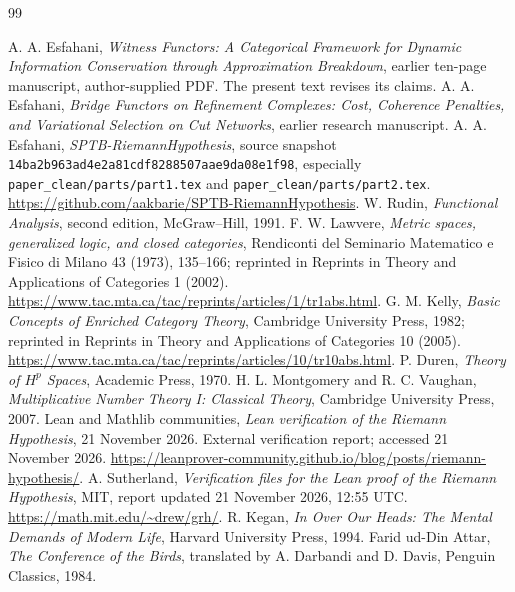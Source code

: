\documentclass[11pt,letterpaper]{article}
\begin{document}
\begin{thebibliography}{99}
\raggedright
{} A. A. Esfahani,
\emph{Witness Functors: A Categorical Framework for Dynamic Information
Conservation through Approximation Breakdown}, earlier ten-page manuscript,
author-supplied PDF. The present text revises its claims.
 A. A. Esfahani,
\emph{Bridge Functors on Refinement Complexes: Cost, Coherence Penalties,
and Variational Selection on Cut Networks}, earlier research manuscript.
 A. A. Esfahani,
\emph{SPTB-RiemannHypothesis}, source snapshot
\texttt{14ba2b963ad4e2a81cdf8288507aae9da08e1f98},
especially \texttt{paper\_clean/parts/part1.tex} and
\texttt{paper\_clean/parts/part2.tex}.
\url{https://github.com/aakbarie/SPTB-RiemannHypothesis}.
 W. Rudin, \emph{Functional Analysis}, second edition,
McGraw--Hill, 1991.
 F. W. Lawvere,
\emph{Metric spaces, generalized logic, and closed categories},
Rendiconti del Seminario Matematico e Fisico di Milano 43 (1973), 135--166;
reprinted in Reprints in Theory and Applications of Categories 1 (2002).
\url{https://www.tac.mta.ca/tac/reprints/articles/1/tr1abs.html}.
 G. M. Kelly, \emph{Basic Concepts of Enriched Category Theory},
Cambridge University Press, 1982; reprinted in Reprints in Theory and
Applications of Categories 10 (2005).
\url{https://www.tac.mta.ca/tac/reprints/articles/10/tr10abs.html}.
 P. Duren, \emph{Theory of $H^p$ Spaces}, Academic Press, 1970.
 H. L. Montgomery and R. C. Vaughan,
\emph{Multiplicative Number Theory I: Classical Theory},
Cambridge University Press, 2007.
 Lean and Mathlib communities,
\emph{Lean verification of the Riemann Hypothesis}, 21 November 2026.
External verification report; accessed 21 November 2026.
\url{https://leanprover-community.github.io/blog/posts/riemann-hypothesis/}.
 A. Sutherland,
\emph{Verification files for the Lean proof of the Riemann Hypothesis},
MIT, report updated 21 November 2026, 12:55 UTC.
\url{https://math.mit.edu/~drew/grh/}.
 R. Kegan, \emph{In Over Our Heads: The Mental Demands of
Modern Life}, Harvard University Press, 1994.
 Farid ud-Din Attar, \emph{The Conference of the Birds},
translated by A. Darbandi and D. Davis, Penguin Classics, 1984.
\end{thebibliography}
\end{document}
